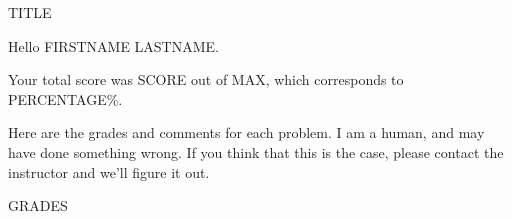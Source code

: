 \documentclass{scrartcl}
\begin{document}
\begin{center}
\textsc{TITLE}
\end{center}

Hello FIRSTNAME LASTNAME.

Your total score was SCORE out of MAX, which corresponds to PERCENTAGE\%.

Here are the grades and comments for each problem. I am a human, and may have done something wrong. If you think that this is the case, please contact the instructor and we'll figure it out.

GRADES
\end{document}
